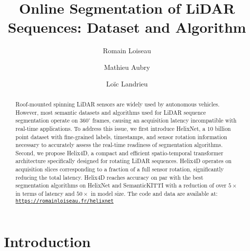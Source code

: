 \documentclass[runningheads]{tpls/llncs}
\begin{document}
\pagestyle{headings}
\mainmatter

\title{Online Segmentation of LiDAR Sequences: Dataset and Algorithm} 


\author{Romain Loiseau
\and
Mathieu Aubry
\and
Loïc Landrieu
}


\maketitle

\begin{abstract}
Roof-mounted spinning LiDAR sensors are widely used by autonomous vehicles. However, most semantic datasets and algorithms used for LiDAR sequence segmentation operate on $360^\circ$ frames, causing an acquisition latency incompatible with real-time applications. To address this issue, we first introduce HelixNet, a $10$ billion point dataset with fine-grained labels, timestamps, and sensor rotation information necessary to accurately assess the real-time readiness of segmentation algorithms. Second, we propose Helix4D, a compact and efficient spatio-temporal transformer architecture specifically designed for rotating LiDAR sequences. Helix4D operates on acquisition slices corresponding to a fraction of a full sensor rotation, significantly reducing the total latency. Helix4D reaches accuracy on par with the best segmentation algorithms on HelixNet and SemanticKITTI with a reduction of over $5\times$ in terms of latency and $50\times$ in model size. The code and data are available at: {\tt{\url{https://romainloiseau.fr/helixnet}}} 
\end{abstract}

\captionsetup[table]{font=small}
\captionsetup[figure]{font=small}
\captionsetup[subfigure]{font=small}

\section{Introduction}\label{sec:introduction}
\end{document}

